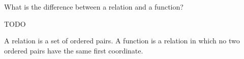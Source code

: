 \documentclass[a4paper,11pt]{article}
\begin{document}
\maketitle

\begin{problem}
What is the difference between a relation and a function?
\end{problem}

\begin{solution}
TODO
\end{solution}

\begin{answer}
A relation is a set of ordered pairs. A function is a relation in which no two ordered pairs have the same first coordinate.
\end{answer}
\end{document}
